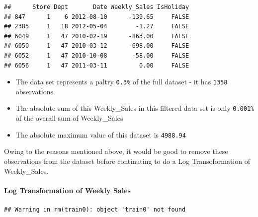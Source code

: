 \documentclass[]{article}
\newenvironment{Shaded}{\begin{snugshade}}{\end{snugshade}}
\newcommand{\KeywordTok}[1]{\textcolor[rgb]{0.13,0.29,0.53}{\textbf{{#1}}}}
\newcommand{\DecValTok}[1]{\textcolor[rgb]{0.00,0.00,0.81}{{#1}}}
\newcommand{\StringTok}[1]{\textcolor[rgb]{0.31,0.60,0.02}{{#1}}}
\newcommand{\NormalTok}[1]{{#1}}
\begin{document}
\begin{verbatim}
##      Store Dept       Date Weekly_Sales IsHoliday
## 847      1    6 2012-08-10      -139.65     FALSE
## 2385     1   18 2012-05-04        -1.27     FALSE
## 6049     1   47 2010-02-19      -863.00     FALSE
## 6050     1   47 2010-03-12      -698.00     FALSE
## 6052     1   47 2010-10-08       -58.00     FALSE
## 6056     1   47 2011-03-11         0.00     FALSE
\end{verbatim}

\begin{itemize}
\itemsep1pt\parskip0pt
\item
  The data set represents a paltry \texttt{0.3\%} of the full dataset -
  it has \texttt{1358} observations
\item
  The absolute sum of this Weekly\_Sales in this filtered data set is
  only \texttt{0.001\%} of the overall sum of Weekly\_Sales
\item
  The absolute maximum value of this dataset is \texttt{4988.94}
\end{itemize}

Owing to the reasons mentioned above, it would be good to remove these
observations from the dataset before continuting to do a Log
Transoformation of Weekly\_Sales.

\paragraph{Log Transformation of Weekly
Sales}\label{log-transformation-of-weekly-sales}

\begin{Shaded}
\end{Shaded}

\begin{verbatim}
## Warning in rm(train0): object 'train0' not found
\end{verbatim}

\begin{Shaded}
\end{Shaded}
\end{document}
